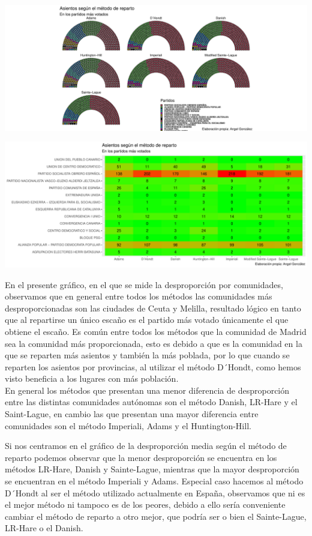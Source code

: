 \documentclass[12pt,a4paper,]{book}
\numberwithin{dummy}{section}
\theoremstyle{ocrenumbox}
\theoremstyle{blacknumex}
\theoremstyle{blacknumbox}
\theoremstyle{ocrenum}
\theoremstyle{ocrenum}
\begin{document}
\begin{center}\includegraphics[width=1\linewidth]{figurasR/unnamed-chunk-79-1} \end{center}

\begin{center}\includegraphics[width=1\linewidth]{figurasR/unnamed-chunk-79-2} \end{center}

En el presente gráfico, en el que se mide la desproporción por
comunidades, observamos que en general entre todos los métodos las
comunidades más desproporcionadas son las ciudades de Ceuta y Melilla,
resultado lógico en tanto que al repartirse un único escaño es el
partido más votado únicamente el que obtiene el escaño. Es común entre
todos los métodos que la comunidad de Madrid sea la comunidad más
proporcionada, esto es debido a que es la comunidad en la que se
reparten más asientos y también la más poblada, por lo que cuando se
reparten los asientos por provincias, al utilizar el método D´Hondt,
como hemos visto beneficia a los lugares con más población.\\
En general los métodos que presentan una menor diferencia de
desproporción entre las distintas comunidades autónomas son el método
Danish, LR-Hare y el Saint-Lague, en cambio las que presentan una mayor
diferencia entre comunidades son el método Imperiali, Adams y el
Huntington-Hill.

Si nos centramos en el gráfico de la desproporción media según el método
de reparto podemos observar que la menor desproporción se encuentra en
los métodos LR-Hare, Danish y Sainte-Lague, mientras que la mayor
desproporción se encuentran en el método Imperiali y Adams. Especial
caso hacemos al método D´Hondt al ser el método utilizado actualmente en
España, observamos que ni es el mejor método ni tampoco es de los
peores, debido a ello sería conveniente cambiar el método de reparto a
otro mejor, que podría ser o bien el Sainte-Lague, LR-Hare o el Danish.
\end{document}
